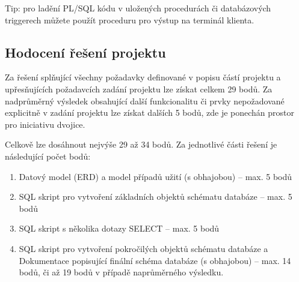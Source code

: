 \documentclass[11pt, a4paper, titlepage]{article}
\begin{document}
Tip: pro ladění PL/SQL kódu v uložených procedurách či databázových triggerech můžete použít proceduru  pro výstup na terminál klienta.
\medskip


\subsection*{Hodocení řešení projektu}

Za řešení splňující všechny požadavky definované v popisu částí projektu a upřesňujících požadavcích zadání projektu lze získat celkem 29 bodů. Za nadprůměrný výsledek obsahující další funkcionalitu či prvky nepožadované explicitně v zadání projektu lze získat dalších 5 bodů, zde je ponechán prostor pro iniciativu dvojice.

Celkově lze dosáhnout nejvýše 29 až 34 bodů. Za jednotlivé části řešení je následující počet bodů:

\begin{enumerate}
	\item Datový model (ERD) a model případů užití (s obhajobou) – max. 5 bodů

	\item SQL skript pro vytvoření základních objektů schématu databáze – max. 5 bodů

	\item SQL skript s několika dotazy SELECT – max. 5 bodů

	\item SQL skript pro vytvoření pokročilých objektů schématu databáze a Dokumentace popisující finální schéma databáze (s obhajobou) – max. 14 bodů, či až 19 bodů v případě naprůměrného výsledku.
\end{enumerate}

\end{document}
